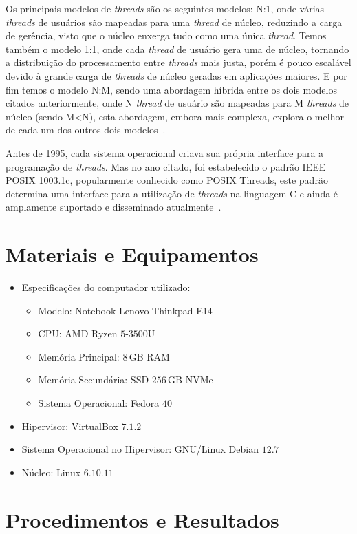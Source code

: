 \documentclass[
	12pt,				%
	oneside,   	        %
	a4paper,			%
	english,			%
	french,				%
	spanish,			%
	brazil,				%
	]{pacotes/abntex2}
\begin{document}
Os principais modelos de \textit{threads} são os seguintes modelos: N:1, onde várias \textit{threads} de usuários são mapeadas para uma \textit{thread} de núcleo, reduzindo a carga de gerência, visto que o núcleo enxerga tudo como uma única \textit{thread}. Temos também o modelo 1:1, onde cada \textit{thread} de  usuário gera uma de núcleo, tornando a distribuição do processamento entre \textit{threads} mais justa, porém é pouco escalável devido à grande carga de \textit{threads} de núcleo geradas em aplicações maiores. E por fim temos o modelo N:M, sendo uma abordagem híbrida entre os dois modelos citados anteriormente, onde N \textit{thread} de usuário são mapeadas para M \textit{threads} de núcleo (sendo M<N), esta abordagem, embora mais complexa, explora o melhor de cada um dos outros dois modelos~\cite{maziero2019}.

Antes de 1995, cada sistema operacional criava sua própria interface para a programação de \textit{threads}. Mas no ano citado, foi estabelecido o padrão IEEE POSIX 1003.1c, popularmente conhecido como POSIX Threads, este padrão determina uma interface para a utilização de \textit{threads} na linguagem C e ainda é amplamente suportado e disseminado atualmente~\cite{maziero2019}.

\section{Materiais e Equipamentos}
\label{sec:materiais}

\begin{itemize}
  \item Especificações do computador utilizado:
  \begin{itemize}
    \item Modelo: Notebook Lenovo Thinkpad E14
    \item CPU: AMD Ryzen $5$-$3500$U
    \item Memória Principal: $8$\,GB RAM
    \item Memória Secundária: SSD $256$\,GB NVMe
    \item Sistema Operacional: Fedora $40$
  \end{itemize}
  \item Hipervisor: VirtualBox $7.1.2$
  \item Sistema Operacional no Hipervisor: GNU/Linux Debian $12.7$
  \item Núcleo: Linux $6.10.11$
\end{itemize}

\section{Procedimentos e Resultados}
\label{sec:procedimentos}
\end{document}
